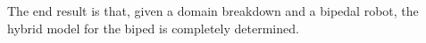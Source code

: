 The end result is that, given a domain breakdown and a bipedal robot, the hybrid model for the biped is completely determined.
%

